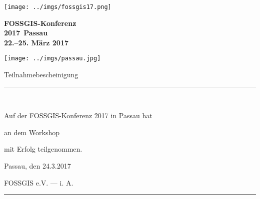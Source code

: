 \documentclass[a4paper, 12pt]{letter}
\begin{document}
 

\DTLsetseparator{,}
{

  \begin{minipage}[c]{0.28\textwidth}
    \vspace{0pt}\texttt{[image: ../imgs/fossgis17.png]}
  \end{minipage}
  \hfill%
  \begin{minipage}[c]{0.72\textwidth}
    \fontsize{38}{38}\selectfont
    \textcolor{grau}{\sffamily\bfseries FOSSGIS-Konferenz\\2017\,}
    \textcolor{blau}{\sffamily\bfseries Passau\\22.--25. März 2017}
  \end{minipage}%
  
  \begin{center}
    \vskip -3mm
    \texttt{[image: ../imgs/passau.jpg]}
  \end{center}
  
  \begin{center}

    \vspace*{4mm}
    \Huge Teilnahmebescheinigung
    \noindent\rule{0.9\textwidth}{1pt}\\
    
    \vspace*{14mm}
    
    \large
    
    Auf der FOSSGIS-Konferenz 2017 in Passau hat\\
    
    \vspace*{5mm}
    
    \Huge
    \person
    
    \vspace*{5mm}
    
    \large
    an dem Workshop
    
    \vspace*{5mm}

    \begin{minipage}{0.7\textwidth}
      \centering\bf\StrBehind[2]{\produkt}{-} %
    \end{minipage}

    \vspace*{5mm}
    
    mit Erfolg teilgenommen.
    
  \end{center}


  \vspace*{18mm}

  \large
  \hskip 1cm Passau, den 24.3.2017
  
  \vspace*{12mm}
  
  \hskip 1cm FOSSGIS e.V. --- i. A. \rule{0.5\textwidth}{0.5pt}
  
  \newpage
} 
\end{document}
